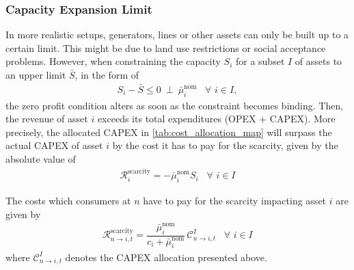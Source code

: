 \documentclass[11pt,twocolumn]{article}
\newcommand{\resultsin}[1]{\hspace{6pt} \bot  \hspace{6pt} #1}
\newcommand{\Forall}[1]{\hspace{10pt} \forall \,\, #1 }
\newcommand{\state}{s_{i,t}}
\newcommand{\capacity}{S_{i}}
\newcommand{\costfactor}{\gamma_{i,t}}
\newcommand{\capacityupper}{\bar{S}}
\newcommand{\muuppernom}{\bar{\mu}^\text{nom}_{i}}
\newcommand{\cost}{\mathcal{C}}
\newcommand{\remainingcost}{\mathcal{R}}
\newcommand{\scarcitycost}{\remainingcost^\text{scarcity}}
\newcommand{\allocatestate}[1][i, n]{A_{#1,t}}
\newcommand{\allocatecost}[1][n \rightarrow i]{\cost_{#1, t}}
\newcommand{\allocatescarcitycost}[1][n \rightarrow i]{\scarcitycost_{#1,t}}
\begin{document}
\subsubsection{Capacity Expansion Limit}

In more realistic setups, generators, lines or other assets can only be built up to a certain limit. This might be due to land use restrictions or social acceptance problems. %
However, when constraining the capacity $\capacity$  for a subset $I$ of assets to an upper limit $\capacityupper$, in the form of 
\begin{align}
    \capacity - \capacityupper \le 0 \resultsin{\muuppernom} \Forall{i \in I}
\label{eq:capacityexpansionmaximum},
\end{align}
the zero profit condition alters as soon as the constraint becomes binding. Then, the revenue of asset $i$ exceeds its total expenditures (OPEX + CAPEX). More precisely, the allocated CAPEX in \cref{tab:cost_allocation_map} will surpass the actual CAPEX of asset $i$ by the cost it has to pay for the scarcity, given by the absolute value of 
\begin{align}
    \scarcitycost_i = - \muuppernom \capacity \Forall{i \in I}
\end{align}


The costs which consumers at $n$ have to pay for the scarcity impacting asset $i$ are given by 
\begin{align}
    \allocatescarcitycost = \dfrac{\muuppernom}{c_i + \muuppernom} \, \allocatecost^I \Forall{i \in I}
\end{align}
where $\allocatecost^I$ denotes the CAPEX allocation presented above. 
\end{document}
